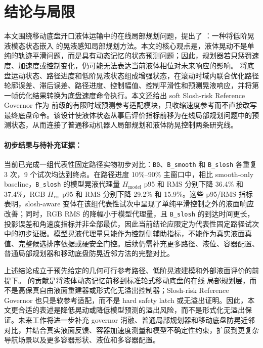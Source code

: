 \section{结论与局限}

本文围绕移动底盘开口液体运输中的在线局部规划问题，提出了 \SPMPC{}：一种将低阶晃液模态状态嵌入 \MPCC{} 的晃液感知局部规划方法。本文的核心观点是，液体晃动不是单纯的轨迹平滑问题，而是具有动态记忆的状态预测问题；因此，规划器若只惩罚速度、加速度或控制变化，仍可能无法表达当前液体相位对未来响应的影响。\SPMPC{} 将底盘运动状态、路径进度和低阶晃液状态组成增强状态，在滚动时域内联合优化路径轮廓误差、滞后误差、路径进度、控制幅值、控制平滑性和预测晃液响应，并将第一帧优化结果转换为底盘速度命令执行。本文还给出 soft Slosh-risk Reference Governor 作为 \MPCC{} 前级的有限时域预测参考适配模块，只收缩速度参考而不直接改写最终底盘命令。该设计使液体状态从事后评价指标前移为在线局部规划问题中的预测状态，从而连接了普通移动机器人局部规划和液体防晃控制两条研究线。

\paragraph{初步结果与待补充证据：} 当前已完成一组代表性固定路径实物初步对比：\texttt{B0}、\texttt{B\_smooth} 和 \texttt{B\_slosh} 各重复 3 次，9 个试次均达到终点。在路径进度 10\%--90\% 主窗口中，相比 smooth-only baseline，\texttt{B\_slosh} 的模型晃液代理量 $H_{\mathrm{model}}$ p95 和 RMS 分别下降 36.4\% 和 37.4\%，RGB $H_{\mathrm{vis}}$ p95 和 RMS 分别下降 29.2\% 和 15.9\%。这些 p95/RMS 指标表明，slosh-aware 变体在该组代表性试次中呈现了单纯平滑控制之外的液面响应改善；同时，RGB RMS 的降幅小于模型代理量，且 \texttt{B\_slosh} 的到达时间更长，投影误差和角速度指标并非全部最优，因此当前结论应限定为代表性固定路径试次中的初步证据。模型晃液代理量只能作为控制侧辅助指标，不能作为真实液面真值、完整候选排序依据或硬安全门控。后续仍需补充更多路径、液位、容器配置、普通局部规划器和移动底盘防晃近邻方法的完整对比。

上述结论成立于预先给定的几何可行参考路径、低阶晃液建模和外部液面评价的前提下。\SPMPC{} 的贡献是将液体动态记忆前移到标准轮式移动底盘的在线 \MPCC{} 局部规划层，而不是高保真自由液面重建器或形式化无溢出控制器；Slosh-risk Reference Governor 也只是软参考适配，而不是 hard safety latch 或无溢出证明。因此，本文更合适的表述是降低晃动或降低模型预测的溢出风险，而不是形式化无溢出保证。未来工作将进一步补充 governor 消融、普通局部规划器和移动底盘防晃近邻对比，并结合真实液面反馈、容器加速度测量和模型不确定性约束，扩展到更复杂导航场景以及更多容器形状、液位和多容器配置。
